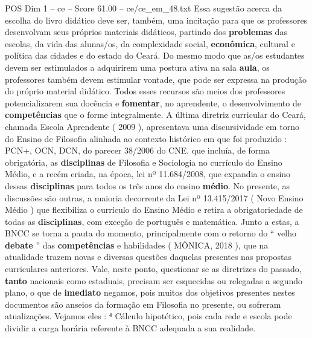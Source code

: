 \begin{textsample}{POS Dim 1 – ce – Score 61.00 – ce/ce\_em\_48.txt}
Essa sugestão acerca da escolha do livro didático deve ser, também, uma incitação para que os professores desenvolvam seus próprios materiais didáticos, partindo dos \textbf{problemas} das escolas, da vida das alunas/os, da complexidade social, \textbf{econômica}, cultural e política das cidades e do estado do Ceará.
Do mesmo modo que as/os estudantes devem ser estimulados a adquirirem uma postura ativa na sala \textbf{aula}, os professores também devem estimular vontade, que pode ser expressa na produção do próprio material didático.
Todos esses recursos são meios dos professores potencializarem sua docência e \textbf{fomentar}, no aprendente, o desenvolvimento de \textbf{competências} que o forme integralmente.
A última diretriz curricular do Ceará, chamada Escola Aprendente ( 2009 ), apresentava uma discursividade em torno do Ensino de Filosofia alinhada ao contexto histórico em que foi produzido : PCN+, OCN, DCN, do parecer 38/2006 do CNE, que incluía, de forma obrigatória, as \textbf{disciplinas} de Filosofia e Sociologia no currículo do Ensino Médio, e a recém criada, na época, lei nº 11.684/2008, que expandia o ensino dessas \textbf{disciplinas} para todos os três anos do ensino \textbf{médio}.
No presente, as discussões são outras, a maioria decorrente da Lei nº 13.415/2017 ( Novo Ensino Médio ) que flexibiliza o currículo do Ensino Médio e retira a obrigatoriedade de todas as \textbf{disciplinas}, com exceção de português e matemática.
Junto a estas, a BNCC se torna a pauta do momento, principalmente com o retorno do “ velho \textbf{debate} ” das \textbf{competências} e habilidades ( MÔNICA, 2018 ), que na atualidade trazem novas e diversas questões daquelas presentes nas propostas curriculares anteriores.
Vale, neste ponto, questionar se as diretrizes do passado, \textbf{tanto} nacionais como estaduais, precisam ser esquecidas ou relegadas a segundo plano, o que de \textbf{imediato} negamos, pois muitos dos objetivos presentes nestes documentos são anseios da formação em Filosofia no presente, ou sofreram atualizações.
Vejamos eles : ⁴ Cálculo hipotético, pois cada rede e escola pode dividir a carga horária referente à BNCC adequada a sua realidade.

\end{textsample}

